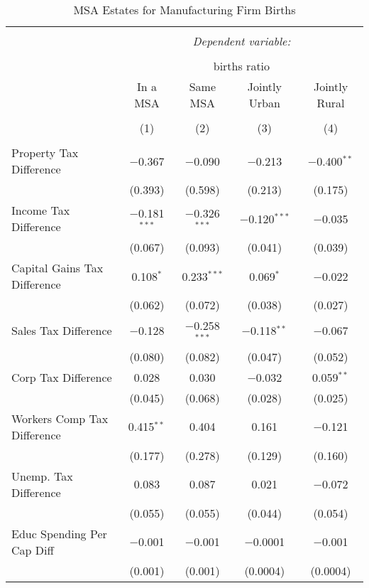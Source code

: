 
\begin{table}[!htbp] \centering 
  \caption{MSA Estates for  Manufacturing Firm Births} 
  \label{} 
\begin{tabular}{@{\extracolsep{5pt}}lcccc} 
\\[-1.8ex]\hline 
\hline \\[-1.8ex] 
 & \multicolumn{4}{c}{\textit{Dependent variable:}} \\ 
\cline{2-5} 
\\[-1.8ex] & \multicolumn{4}{c}{births ratio} \\ 
 & In a MSA & Same MSA & Jointly Urban & Jointly Rural \\ 
\\[-1.8ex] & (1) & (2) & (3) & (4)\\ 
\hline \\[-1.8ex] 
 Property Tax Difference & $-$0.367 & $-$0.090 & $-$0.213 & $-$0.400$^{**}$ \\ 
  & (0.393) & (0.598) & (0.213) & (0.175) \\ 
  Income Tax Difference & $-$0.181$^{***}$ & $-$0.326$^{***}$ & $-$0.120$^{***}$ & $-$0.035 \\ 
  & (0.067) & (0.093) & (0.041) & (0.039) \\ 
  Capital Gains Tax Difference & 0.108$^{*}$ & 0.233$^{***}$ & 0.069$^{*}$ & $-$0.022 \\ 
  & (0.062) & (0.072) & (0.038) & (0.027) \\ 
  Sales Tax Difference & $-$0.128 & $-$0.258$^{***}$ & $-$0.118$^{**}$ & $-$0.067 \\ 
  & (0.080) & (0.082) & (0.047) & (0.052) \\ 
  Corp Tax Difference & 0.028 & 0.030 & $-$0.032 & 0.059$^{**}$ \\ 
  & (0.045) & (0.068) & (0.028) & (0.025) \\ 
  Workers Comp Tax Difference & 0.415$^{**}$ & 0.404 & 0.161 & $-$0.121 \\ 
  & (0.177) & (0.278) & (0.129) & (0.160) \\ 
  Unemp. Tax Difference & 0.083 & 0.087 & 0.021 & $-$0.072 \\ 
  & (0.055) & (0.055) & (0.044) & (0.054) \\ 
  Educ Spending Per Cap Diff & $-$0.001 & $-$0.001 & $-$0.0001 & $-$0.001 \\ 
  & (0.001) & (0.001) & (0.0004) & (0.0004) \\ 

\end{tabular}
\end{table}
